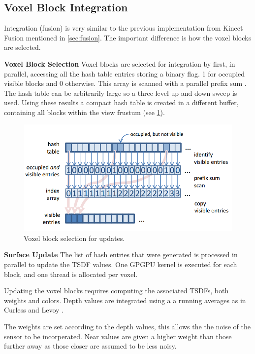 \documentclass[10pt, twocolumn]{article}
\begin{document}
\subsection{Voxel Block Integration}

Integration (fusion) is very similar to the previous implementation from Kinect Fusion
mentioned in \ref{sec:fusion}. The important difference is how the voxel blocks
are selected.

\noindent
\textbf{Voxel Block Selection} Voxel blocks are selected for integration by
first, in parallel, accessing all the hash table entries storing a binary flag.
1 for occupied visible blocks and 0 otherwise. This array is scanned with a
parallel prefix sum \cite{harris2007parallel}. The hash table can be arbitrarily
large so a three level up and down sweep is used. Using these results a compact
hash table is created in a different buffer, containing all blocks within the
view frustum (see \ref{fig:selection}).

\begin{figure}
  \centering
  \includegraphics[width=1.0\linewidth]{viewfrustumselection}
  \caption{Voxel block selection for updates.}
  \label{fig:selection}
\end{figure}

\noindent
\textbf{Surface Update} The list of hash entries that were generated is
processed in parallel to update the TSDF values. One GPGPU kernel is executed
for each block, and one thread is allocated per voxel.

Updating the voxel blocks requires computing the associated TSDFs, both weights
and colors. Depth values are integrated using a a running averages as in Curless
and Levoy \cite{curless1996}. 

The weights are set according to the depth values, this allows the the noise of
the sensor to be incorperated. Near values are given a higher weight than those
further away as those closer are assumed to be less noisy. 
\end{document}
